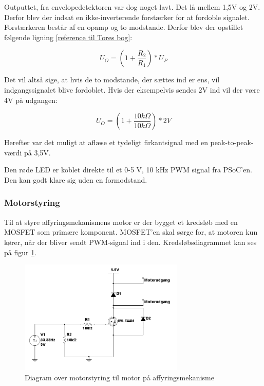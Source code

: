 Outputtet, fra envelopedetektoren var dog noget lavt. Det lå mellem 1,5V og 2V. Derfor blev der indsat en ikke-inverterende forstærker for at fordoble signalet. Forstærkeren består af en opamp og to modstande. Derfor blev der opstillet følgende ligning \ref{reference til Tores bog}: 

\begin{equation} 
	U_{O}=(1+\frac{R_{2}}{R_{1}})*U_{P}
\end{equation}

Det vil altså sige, at hvis de to modstande, der sættes ind er ens, vil indgangssignalet blive fordoblet. Hvis der eksempelvis sendes 2V ind vil der være 4V på udgangen: 

\begin{equation}
	U_{O}=(1+\frac{10k\Omega}{10k\Omega})*2V
\end{equation}

Herefter var det muligt at aflæse et tydeligt firkantsignal med en peak-to-peak-værdi på 3,5V. 

Den røde LED er koblet direkte til et 0-5 V, 10 kHz PWM signal fra PSoC'en. Den kan godt klare sig uden en formodstand. 

\subsubsection{Motorstyring}
Til at styre affyringsmekanismens motor er der bygget et kredsløb med en MOSFET som primære komponent. MOSFET'en skal sørge for, at motoren kun kører, når der bliver sendt PWM-signal ind i den. Kredsløbsdiagrammet kan ses på figur \ref{fig:affyringsmotor}. 

\begin{figure}[H]
	\centering
	\includegraphics[width=0.7\textwidth]{Afsnit/DesignOgImplementering/images/motor_affyring}
	\caption{Diagram over motorstyring til motor på affyringsmekanisme}
	\label{fig:affyringsmotor}
\end{figure}

